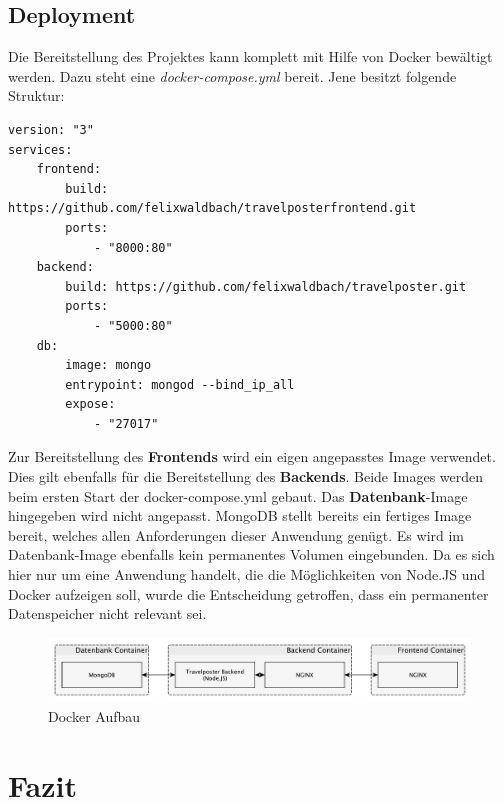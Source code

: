 \documentclass[12pt,a4paper]{report}
\begin{document}
\section{Deployment}
Die Bereitstellung des Projektes kann komplett mit Hilfe von Docker bewältigt werden. Dazu steht eine \textit{docker-compose.yml} bereit. Jene besitzt folgende Struktur:

\begin{verbatim}
version: "3"
services:
    frontend:
        build: https://github.com/felixwaldbach/travelposterfrontend.git
        ports:
            - "8000:80"
    backend:
        build: https://github.com/felixwaldbach/travelposter.git
        ports:
            - "5000:80"
    db:
        image: mongo
        entrypoint: mongod --bind_ip_all
        expose: 
            - "27017"
\end{verbatim}

Zur Bereitstellung des \textbf{Frontends} wird ein eigen angepasstes Image verwendet. Dies gilt ebenfalls für die Bereitstellung des \textbf{Backends}. Beide Images werden beim ersten Start der docker-compose.yml gebaut. Das \textbf{Datenbank}-Image hingegeben wird nicht angepasst. MongoDB stellt bereits ein fertiges Image bereit, welches allen Anforderungen dieser Anwendung genügt. Es wird im Datenbank-Image ebenfalls kein permanentes Volumen eingebunden. Da es sich hier nur um eine Anwendung handelt, die die Möglichkeiten von Node.JS und Docker aufzeigen soll, wurde die Entscheidung getroffen, dass ein permanenter Datenspeicher nicht relevant sei.

\begin{figure}[h]
	\centering
	\includegraphics[width=1\linewidth]{Bilder_Doku/docker}
	\caption[]{Docker Aufbau}
\end{figure}

\newpage
\chapter{Fazit}
\end{document}
